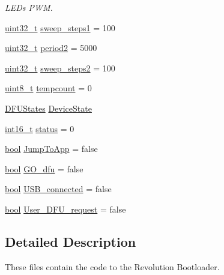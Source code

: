 \begin{DoxyCompactItemize}
\begin{DoxyCompactList}\small\item\em L\-E\-Ds P\-W\-M. \end{DoxyCompactList}\item 
\hyperlink{stdint_8h_a435d1572bf3f880d55459d9805097f62}{uint32\-\_\-t} \hyperlink{group___revolution_b_l_ga594b91aa3e135c58969dc298b8acdeb3}{sweep\-\_\-steps1} = 100
\item 
\hyperlink{stdint_8h_a435d1572bf3f880d55459d9805097f62}{uint32\-\_\-t} \hyperlink{group___revolution_b_l_gadf8633b43922fbf4f1d86981daf74ccc}{period2} = 5000
\item 
\hyperlink{stdint_8h_a435d1572bf3f880d55459d9805097f62}{uint32\-\_\-t} \hyperlink{group___revolution_b_l_gac9cf28c40cee906b9405cb32f16b1fa2}{sweep\-\_\-steps2} = 100
\item 
\hyperlink{stdint_8h_aba7bc1797add20fe3efdf37ced1182c5}{uint8\-\_\-t} \hyperlink{group___revolution_b_l_ga61692259c50bf6def0bc56b1c2fd44b8}{tempcount} = 0
\item 
\hyperlink{group___copter_control_b_l_ga9a9e510f2da4e725074c7191d9d75d37}{D\-F\-U\-States} \hyperlink{group___revolution_b_l_ga342208ed1954c6486eac389edf7c7f86}{Device\-State}
\item 
\hyperlink{stdint_8h_aa343fa3b3d06292b959ffdd4c4703b06}{int16\-\_\-t} \hyperlink{group___revolution_b_l_ga2414697de79a243562514a0a4344a4dd}{status} = 0
\item 
\hyperlink{group___exported__types_gaf6a258d8f3ee5206d682d799316314b1}{bool} \hyperlink{group___revolution_b_l_ga31be3333eed4c575309bd493c4f42676}{Jump\-To\-App} = false
\item 
\hyperlink{group___exported__types_gaf6a258d8f3ee5206d682d799316314b1}{bool} \hyperlink{group___revolution_b_l_gae748e69028fd1006578682a64009ca1b}{G\-O\-\_\-dfu} = false
\item 
\hyperlink{group___exported__types_gaf6a258d8f3ee5206d682d799316314b1}{bool} \hyperlink{group___revolution_b_l_ga4e4577933ec2d1b36fd2a19510090d43}{U\-S\-B\-\_\-connected} = false
\item 
\hyperlink{group___exported__types_gaf6a258d8f3ee5206d682d799316314b1}{bool} \hyperlink{group___revolution_b_l_ga4df4c80fe3df830049b9543a72b125a5}{User\-\_\-\-D\-F\-U\-\_\-request} = false
\end{DoxyCompactItemize}


\subsection{Detailed Description}
These files contain the code to the Revolution Bootloader. 

